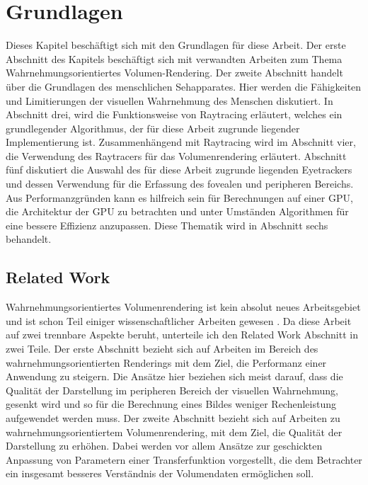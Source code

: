 
\chapter{Grundlagen}\label{chap::basics}
\label{chap:k2}
Dieses Kapitel beschäftigt sich mit den Grundlagen für diese Arbeit.
Der erste Abschnitt des Kapitels beschäftigt sich mit verwandten Arbeiten zum Thema Wahrnehmungsorientiertes Volumen-Rendering.
Der zweite Abschnitt handelt über die Grundlagen des menschlichen Sehapparates.
Hier werden die Fähigkeiten und Limitierungen der visuellen Wahrnehmung des Menschen diskutiert.
In Abschnitt drei, wird die Funktionsweise von Raytracing erläutert, welches ein grundlegender Algorithmus, der für diese Arbeit zugrunde liegender Implementierung ist.
Zusammenhängend mit Raytracing wird im Abschnitt vier, die Verwendung des Raytracers für das Volumenrendering erläutert.
Abschnitt fünf diskutiert die Auswahl des für diese Arbeit zugrunde liegenden Eyetrackers und dessen Verwendung für die Erfassung des fovealen und peripheren Bereichs.
Aus Performanzgründen kann es hilfreich sein für Berechnungen auf einer GPU, die Architektur der GPU zu betrachten und unter Umständen Algorithmen für eine bessere Effizienz anzupassen.
Diese Thematik wird in Abschnitt sechs behandelt.

\section{Related Work}\label{sec::relwo}
Wahrnehmungsorientiertes Volumenrendering ist kein absolut neues Arbeitsgebiet und ist schon Teil einiger wissenschaftlicher Arbeiten gewesen .
Da diese Arbeit auf zwei trennbare Aspekte beruht, unterteile ich den Related Work Abschnitt in zwei Teile.
Der erste Abschnitt bezieht sich auf Arbeiten im Bereich des wahrnehmungsorientierten Renderings mit dem Ziel, die Performanz einer Anwendung zu steigern.
Die Ansätze hier beziehen sich meist darauf, dass die Qualität der Darstellung im peripheren Bereich der visuellen Wahrnehmung, gesenkt wird und so für die Berechnung eines Bildes weniger Rechenleistung aufgewendet werden muss.
Der zweite Abschnitt bezieht sich auf Arbeiten zu wahrnehmungsorientiertem Volumenrendering, mit dem Ziel, die Qualität der Darstellung zu erhöhen.
Dabei werden vor allem Ansätze zur geschickten Anpassung von Parametern einer Transferfunktion vorgestellt, die dem Betrachter ein insgesamt besseres Verständnis der Volumendaten ermöglichen soll.
